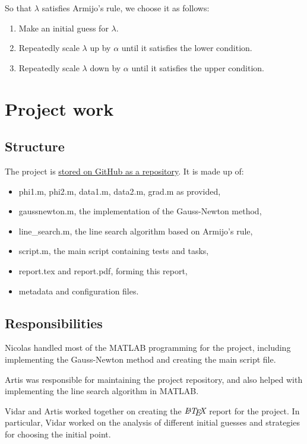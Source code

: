 \documentclass[12pt, a4paper]{article}
\begin{document}
So that $\lambda$ satisfies Armijo's rule, we choose it as follows:\begin{enumerate}
    \item Make an initial guess for $\lambda$.
    \item Repeatedly scale $\lambda$ up by $\alpha$ until it satisfies the lower condition.
    \item Repeatedly scale $\lambda$ down by $\alpha$ until it satisfies the upper condition. 
\end{enumerate}

\section{Project work}

\subsection{Structure}

The project is \href{https://github.com/artis-v/gauss-newton}{stored on GitHub as a repository}. It is made up of:\begin{itemize}
    \item phi1.m, phi2.m, data1.m, data2.m, grad.m as provided,
    \item gaussnewton.m, the implementation of the Gauss-Newton method,
    \item line\_search.m, the line search algorithm based on Armijo's rule,
    \item script.m, the main script containing tests and tasks,
    \item report.tex and report.pdf, forming this report,
    \item metadata and configuration files.
\end{itemize}

\subsection{Responsibilities}

Nicolas handled most of the MATLAB programming for the project, including implementing the Gauss-Newton method and creating the main script file.

Artis was responsible for maintaining the project repository, and also helped with implementing the line search algorithm in MATLAB.

Vidar and Artis worked together on creating the $\textit{\LaTeX}$ report for the project. In particular, Vidar worked on the analysis of different initial guesses and strategies for choosing the initial point.
\end{document}
